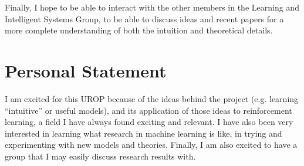 \documentclass{article}[11pt]
\begin{document}
Finally, I hope to be able to interact with the other
members in the Learning and Intelligent Systems Group,
to be able to discuss ideas and recent papers for a more
complete understanding of both the intuition and
theoretical details.


\section{Personal Statement}
I am excited for this UROP because of the ideas
behind the project (e.g. learning ``intuitive'' or
useful models), and its application of those
ideas to reinforcement learning, a field I have
always found exciting and relevant. I have also
been very interested in learning what research
in machine learning is like, in trying
and experimenting with new models and theories.
Finally, I am also excited to have a group
that I may easily discuss research results with.



\end{document}
